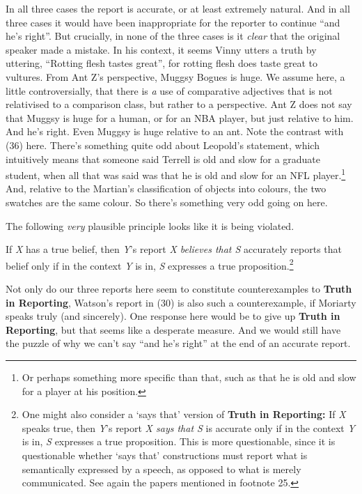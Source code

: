 \documentclass[
  10pt,
  letterpaper,
  DIV=11,
  numbers=noendperiod,
  twoside]{scrartcl}
\providecommand{\tightlist}{%
  \setlength{\itemsep}{0pt}\setlength{\parskip}{0pt}}\usepackage{longtable,booktabs,array}
\begin{document}
In all three cases the report is accurate, or at least extremely
natural. And in all three cases it would have been inappropriate for the
reporter to continue ``and he's right''. But crucially, in none of the
three cases is it \emph{clear} that the original speaker made a mistake.
In his context, it seems Vinny utters a truth by uttering, ``Rotting
flesh tastes great'', for rotting flesh does taste great to vultures.
From Ant Z's perspective, Muggsy Bogues is huge. We assume here, a
little controversially, that there is \emph{a} use of comparative
adjectives that is not relativised to a comparison class, but rather to
a perspective. Ant Z does not say that Muggsy is huge for a human, or
for an NBA player, but just relative to him. And he's right. Even Muggsy
is huge relative to an ant. Note the contrast with (36) here. There's
something quite odd about Leopold's statement, which intuitively means
that someone said Terrell is old and slow for a graduate student, when
all that was said was that he is old and slow for an NFL
player.\footnote{Or perhaps something more specific than that, such as
  that he is old and slow for a player at his position.} And, relative
to the Martian's classification of objects into colours, the two
swatches are the same colour. So there's something very odd going on
here.

The following \emph{very} plausible principle looks like it is being
violated.

\begin{description}
\tightlist
\item[Truth in Reporting]
If \emph{X} has a true belief, then \emph{Y}'s report \emph{X believes
that S} accurately reports that belief only if in the context \emph{Y}
is in, \emph{S} expresses a true proposition.\footnote{One might also
  consider a `says that' version of \textbf{Truth in Reporting:} If
  \emph{X} speaks true, then \emph{Y}'s report \emph{X says that S} is
  accurate only if in the context \emph{Y} is in, \emph{S} expresses a
  true proposition. This is more questionable, since it is questionable
  whether `says that' constructions must report what is semantically
  expressed by a speech, as opposed to what is merely communicated. See
  again the papers mentioned in footnote 25.}
\end{description}

Not only do our three reports here seem to constitute counterexamples to
\textbf{Truth in Reporting}, Watson's report in (30) is also such a
counterexample, if Moriarty speaks truly (and sincerely). One response
here would be to give up \textbf{Truth in Reporting}, but that seems
like a desperate measure. And we would still have the puzzle of why we
can't say ``and he's right'' at the end of an accurate report.
\end{document}
